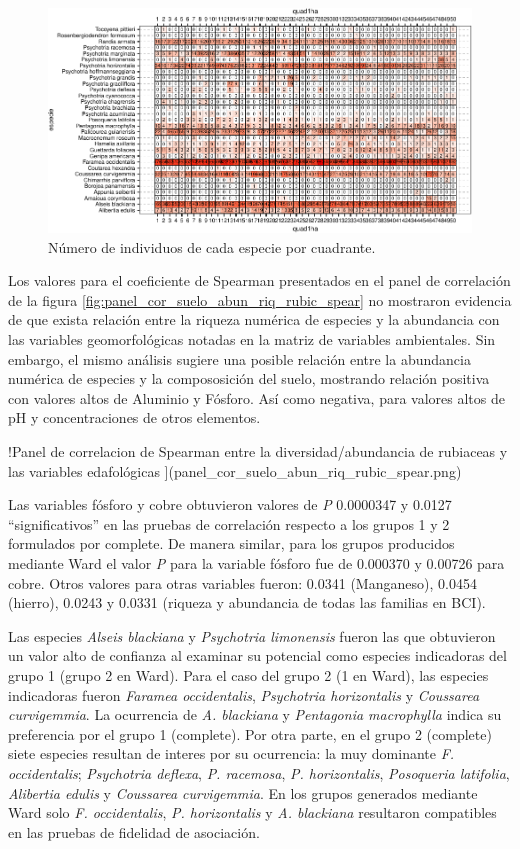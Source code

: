 \documentclass[11pt,]{article}
\begin{document}
\begin{figure}
\centering
\includegraphics{manuscrito_files/figure-latex/unnamed-chunk-3-1.pdf}
\caption{\label{fig:abun_sp_q}Número de individuos de cada especie por
cuadrante.}
\end{figure}

Los valores para el coeficiente de Spearman presentados en el panel de
correlación de la figura \ref{fig:panel_cor_suelo_abun_riq_rubic_spear}
no mostraron evidencia de que exista relación entre la riqueza numérica
de especies y la abundancia con las variables geomorfológicas notadas en
la matriz de variables ambientales. Sin embargo, el mismo análisis
sugiere una posible relación entre la abundancia numérica de especies y
la compososición del suelo, mostrando relación positiva con valores
altos de Aluminio y Fósforo. Así como negativa, para valores altos de pH
y concentraciones de otros elementos.

!Panel de correlacion de Spearman entre la diversidad/abundancia de
rubiaceas y las variables edafológicas
\label{fig:panel_cor_suelo_abun_riq_rubic_spear}{]}(panel\_cor\_suelo\_abun\_riq\_rubic\_spear.png)

Las variables fósforo y cobre obtuvieron valores de \emph{P} 0.0000347 y
0.0127 ``significativos'' en las pruebas de correlación respecto a los
grupos 1 y 2 formulados por complete. De manera similar, para los grupos
producidos mediante Ward el valor \emph{P} para la variable fósforo fue
de 0.000370 y 0.00726 para cobre. Otros valores para otras variables
fueron: 0.0341 (Manganeso), 0.0454 (hierro), 0.0243 y 0.0331 (riqueza y
abundancia de todas las familias en BCI).

Las especies \emph{Alseis blackiana} y \emph{Psychotria limonensis}
fueron las que obtuvieron un valor alto de confianza al examinar su
potencial como especies indicadoras del grupo 1 (grupo 2 en Ward). Para
el caso del grupo 2 (1 en Ward), las especies indicadoras fueron
\emph{Faramea occidentalis}, \emph{Psychotria horizontalis} y
\emph{Coussarea curvigemmia}. La ocurrencia de \emph{A. blackiana} y
\emph{Pentagonia macrophylla} indica su preferencia por el grupo 1
(complete). Por otra parte, en el grupo 2 (complete) siete especies
resultan de interes por su ocurrencia: la muy dominante \emph{F.
occidentalis}; \emph{Psychotria deflexa}, \emph{P. racemosa}, \emph{P.
horizontalis}, \emph{Posoqueria latifolia}, \emph{Alibertia edulis} y
\emph{Coussarea curvigemmia}. En los grupos generados mediante Ward solo
\emph{F. occidentalis}, \emph{P. horizontalis} y \emph{A. blackiana}
resultaron compatibles en las pruebas de fidelidad de asociación.
\end{document}
